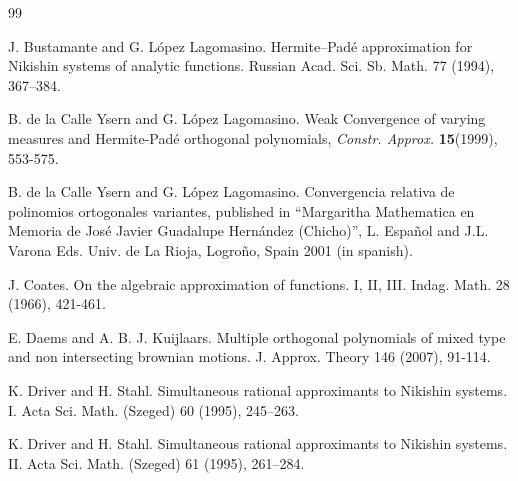 \documentclass{amsart}
\theoremstyle{definition}
\theoremstyle{remark}
\begin{document}
\begin{thebibliography}{99}


 J. Bustamante and G. L\'opez Lagomasino. Hermite--Pad\'e approximation for Nikishin systems of analytic functions. Russian Acad. Sci. Sb. Math.  77 (1994), 367--384.

B. de la Calle Ysern and G. L\'{o}pez Lagomasino.  Weak
Convergence of varying measures and Hermite-Pad\'{e} orthogonal
polynomials, {\sl Constr. Approx.}  {\bf 15}(1999), 553-575.

B. de la Calle Ysern and G. L\'{o}pez Lagomasino. Convergencia
relativa de polinomios ortogonales variantes, published in
``Margaritha Mathematica en Memoria de Jos\'{e} Javier Guadalupe
Hern\'{a}ndez (Chicho)'', L. Espa\~{n}ol and J.L. Varona Eds.
Univ. de La Rioja, Logro\~{n}o, Spain 2001 (in spanish).

  J. Coates. On the algebraic approximation of functions. I, II, III. Indag. Math.  28 (1966), 421-461.

  E. Daems and A. B. J. Kuijlaars. Multiple orthogonal polynomials of mixed type and non intersecting brownian motions. J. Approx. Theory  146 (2007), 91-114.



 K. Driver and H. Stahl. Simultaneous rational approximants
to Nikishin systems. I. Acta Sci. Math. (Szeged)  60 (1995), 245--263.

 K. Driver and  H. Stahl. Simultaneous rational approximants
to Nikishin systems. II. Acta Sci. Math. (Szeged)  61 (1995), 261--284.




\end{thebibliography}
\end{document}
